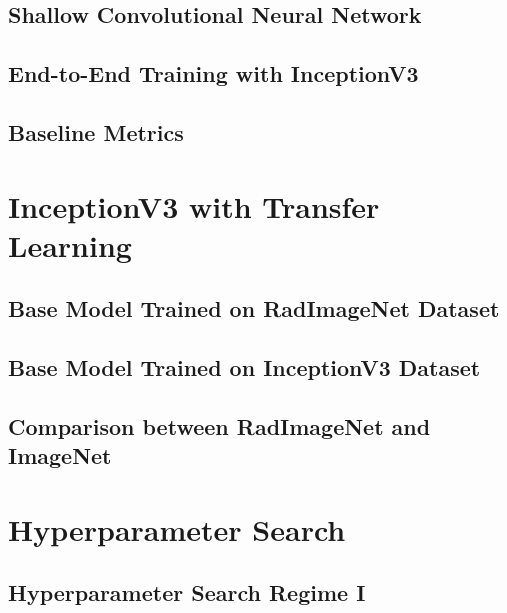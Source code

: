 \subsection{Shallow Convolutional Neural Network}





\subsection{End-to-End Training with InceptionV3}





\subsection{Baseline Metrics}

\section{InceptionV3 with Transfer Learning}

\subsection{Base Model Trained on RadImageNet Dataset}



\subsection{Base Model Trained on InceptionV3 Dataset}



\subsection{Comparison between RadImageNet and ImageNet}

\section{Hyperparameter Search}

\subsection{Hyperparameter Search Regime I}

